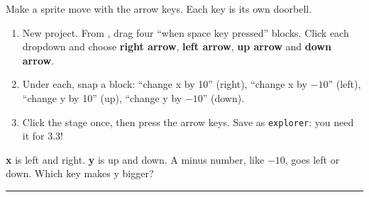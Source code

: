 \begin{exercise}
Make a sprite move with the arrow keys. Each key is its own doorbell.
\begin{enumerate}[leftmargin=1.4em,itemsep=1pt]
  \item New project. From , drag four \enquote{when space key pressed} blocks. Click each dropdown and choose \textbf{right arrow}, \textbf{left arrow}, \textbf{up arrow} and \textbf{down arrow}.
  \item Under each, snap a  block: \enquote{change x by 10} (right), \enquote{change x by $-10$} (left), \enquote{change y by 10} (up), \enquote{change y by $-10$} (down).
  \item Click the stage once, then press the arrow keys. Save as \texttt{explorer}: you need it for 3.3!
\end{enumerate}
\begin{center}
\begin{scratch}[scale=0.78]
\end{scratch}\hspace{0.4cm}
\begin{scratch}[scale=0.78]
\end{scratch}\hspace{0.4cm}
\begin{scratch}[scale=0.78]
\end{scratch}

\medskip
\begin{scratch}[scale=0.78]
\end{scratch}
\end{center}
\textbf{x} is left and right. \textbf{y} is up and down. A minus number, like $-10$, goes left or down. Which key makes y bigger? \rule{3cm}{0.4pt}
\end{exercise}

